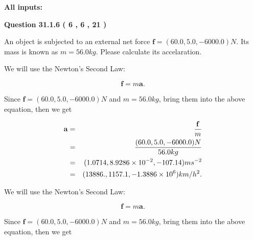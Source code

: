 \documentclass[12pt]{article}
\begin{document}
   
   
   
\noindent{}
   
   
   
   
\noindent\vspace{0.1in}\hspace{-0.08in} {\textbf{\Large{All inputs: }}}
   
   
  
\vspace{0.2in}
  
{\textbf{\Large{Question
31.1.6 
 (           6 ,           6 ,          21 )
}}}
  
  
 
An object is subjected to an external net force $\mathbf{f}=(
60.0,  %
5.0,
-6000.0  )N$. Its mass is known as
$m= %
56.0 kg$. Please calculate its accelaration.
 
 
 
 
\noindent{}
 
 

We will use the Newton's Second Law:
 
\[
\mathbf{f}=m\mathbf{a}.
\]
 
Since $\mathbf{f}=( %
60.0,  %
5.0,  %
-6000.0 )N$
and $m= %
56.0 kg$, bring them into the above equation, then we get
 
\begin{eqnarray*}
\mathbf{a}&=&\frac{\mathbf{f}}m  \\
&=&\frac{(
60.0 ,
5.0 ,
-6000.0 )N
}{ %
56.0 kg}  \\
&=&(
1.0714 ,
8.9286 \times 10^{-2},
-107.14
)ms^{-2} \\
&=&(
13886. ,
1157.1 ,
-1.3886 \times 10^{6}
)km/h^2.
\end{eqnarray*}
 
 
 
\noindent{}
 
 

 
 
 
\noindent{}
 
 

We will use the Newton's Second Law:
 
\[
\mathbf{f}=m\mathbf{a}.
\]
 
Since $\mathbf{f}=( %
60.0,  %
5.0,  %
-6000.0 )N$
and $m= %
56.0 kg$, bring them into the above equation, then we get
 
\end{document}

